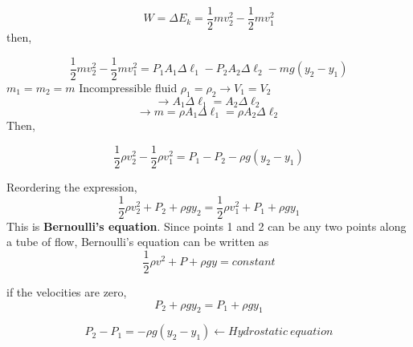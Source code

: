 \documentclass[]{beamer}
\begin{document}
\begin{frame}


\begin{equation*}
W=\Delta E_k=\frac{1}{2}mv^2_2-\frac{1}{2}mv^2_1
\end{equation*}
\pause
then,


\begin{equation*}
\frac{1}{2}mv^2_2-\frac{1}{2}mv^2_1=P_1A_1\Delta \ell_1-P_2 A_2 \Delta \ell_2-mg(y_2-y_1)
\end{equation*}
\pause
$m_1=m_2=m$ Incompressible fluid $\rho_1=\rho_2\rightarrow V_1=V_2$
\pause
\begin{equation*}
\rightarrow A_1\Delta \ell_1=A_2 \Delta \ell_2
\end{equation*}
\pause
\begin{equation*}
\rightarrow m=\rho A_1\Delta \ell_1=\rho A_2\Delta \ell_2
\end{equation*}
\pause
Then,

\begin{equation*}
\frac{1}{2}\rho v^2_2-\frac{1}{2}\rho v^2_1=P_1-P_2-\rho g(y_2-y_1)
\end{equation*}



  \end{frame}




\begin{frame}


Reordering the expression,
\vspace{3mm}
\pause
\begin{equation*}
\frac{1}{2}\rho v^2_2+P_2+ \rho gy_2=\frac{1}{2} \rho v^2_1+P_1+ \rho gy_1 
\end{equation*}
\pause
\vspace{3mm}
\pause
This is \textbf{Bernoulli’s equation}. Since points 1 and 2 can be any two points along a
tube of flow, Bernoulli’s equation can be written as
\vspace{3mm}
\pause
\begin{equation}
\boxed{\frac{1}{2}\rho v^2+P+ \rho gy=constant}
\end{equation}



  \end{frame}


\begin{frame}


if the velocities are zero, 
\pause
\begin{equation*}
P_2+ \rho gy_2=P_1+ \rho gy_1 
\end{equation*}

\pause
\begin{equation}
P_2-P_1=-\rho g(y_2-y_1) \leftarrow Hydrostatic~equation
\end{equation}
\vspace{3mm}



  \end{frame}
\end{document}
